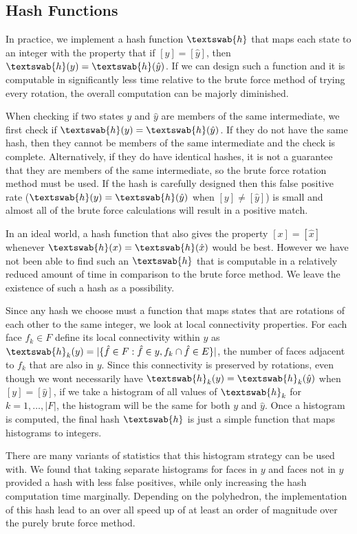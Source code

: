 \subsection{Hash Functions}
In practice, we implement a hash function $\textswab{h}$ that maps each state to an integer with the property that if $[y] = [\hat{y}]$, then $\textswab{h}(y) = \textswab{h}(\hat{y})$. If we can design such a function and it is computable in significantly less time relative to the brute force method of trying every rotation, the overall computation can be majorly diminished. 

When checking if two states $y$ and $\hat{y}$ are members of the same intermediate, we first check if $\textswab{h}(y) = \textswab{h}(\hat{y})$. If they do not have the same hash, then they cannot be members of the same intermediate and the check is complete. Alternatively, if they do have identical hashes, it is not a guarantee that they are members of the same intermediate, so the brute force rotation method must be used. If the hash is carefully designed then this false positive rate ($\textswab{h}(y) = \textswab{h}(\hat{y})$ when $[y] \neq [\hat{y}]$) is small and almost all of the brute force calculations will result in a positive match. 

In an ideal world, a hash function that also gives the property $[x] = [\hat{x}]$ whenever $\textswab{h}(x) = \textswab{h}(\hat{x})$ would be best. However we have not been able to find such an $\textswab{h}$ that is computable in a relatively reduced amount of time in comparison to the brute force method. We leave the existence of such a hash as a possibility. 

Since any hash we choose must a function that maps states that are rotations of each other to the same integer, we look at local connectivity properties. For each face $f_k \in F$ define its local connectivity within $y$ as  $\textswab{h}_k(y) = |\{\hat{f} \in F : \hat{f} \in y, f_k \cap \hat{f} \in E\}|$, the number of faces adjacent to $f_k$ that are also in $y$. Since this connectivity is preserved by rotations, even though we wont necessarily have $\textswab{h}_k(y) = \textswab{h}_k(\hat{y})$ when $[y] = [\hat{y}]$, if we take a histogram of all values of $\textswab{h}_k$ for $k = 1,\dots,|F|$, the histogram will be the same for both $y$ and $\hat{y}$. Once a histogram is computed, the final hash $\textswab{h}$ is just a simple function that maps histograms to integers.

There are many variants of statistics that this histogram strategy can be used with. We found that taking separate histograms for faces in $y$ and faces not in $y$ provided a hash with less false positives, while only increasing the hash computation time marginally. Depending on the polyhedron, the implementation of this hash lead to an over all speed up of at least an order of magnitude over the purely brute force method.  

